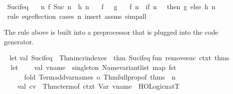 \begin{isabellebody}
\ Suc{\isacharunderscore}if{\isacharunderscore}eq{\isacharcolon}\isanewline
\ \ \ {\isachardoublequoteopen}{\isasymAnd}n{\isachardot}\ f\ {\isacharparenleft}Suc\ n{\isacharparenright}\ {\isasymequiv}\ h\ n{\isachardoublequoteclose}\isanewline
\ \ \ {\isachardoublequoteopen}f\ {}\ {\isasymequiv}\ g{\isachardoublequoteclose}\isanewline
\ \ \ {\isachardoublequoteopen}f\ n\ {\isasymequiv}\ if\ n\ {\isacharequal}\ {}\ then\ g\ else\ h\ {\isacharparenleft}n\ {\isacharminus}\ {}{\isacharparenright}{\isachardoublequoteclose}\isanewline
%
\isadelimproof
\ \ %
\endisadelimproof
%
\isatagproof
{}\isamarkupfalse%
\ {\isacharparenleft}rule\ eq{\isacharunderscore}reflection{\isacharparenright}\ {\isacharparenleft}cases\ n{\isacharcomma}\ insert\ assms{\isacharcomma}\ simp{\isacharunderscore}all{\isacharparenright}%
\endisatagproof
{\isafoldproof}%
%
\isadelimproof
%
\endisadelimproof
%
\begin{isamarkuptext}%
The rule above is built into a preprocessor that is plugged into
  the code generator.%
\end{isamarkuptext}\isamarkuptrue%
%
\isadelimML
%
\endisadelimML
%
\isatagML
{}\isamarkupfalse%
\ {\isacartoucheopen}\isanewline
let\isanewline
\isanewline
val\ Suc{\isacharunderscore}if{\isacharunderscore}eq\ {\isacharequal}\ Thm{\isachardot}incr{\isacharunderscore}indexes\ {}\ {\isacharat}{\isacharbraceleft}thm\ Suc{\isacharunderscore}if{\isacharunderscore}eq{\isacharbraceright}{\isacharsemicolon}\isanewline
\isanewline
fun\ remove{\isacharunderscore}suc\ ctxt\ thms\ {\isacharequal}\isanewline
\ \ let\isanewline
\ \ \ \ val\ vname\ {\isacharequal}\ singleton\ {\isacharparenleft}Name{\isachardot}variant{\isacharunderscore}list\ {\isacharparenleft}map\ fst\isanewline
\ \ \ \ \ \ {\isacharparenleft}fold\ {\isacharparenleft}Term{\isachardot}add{\isacharunderscore}var{\isacharunderscore}names\ o\ Thm{\isachardot}full{\isacharunderscore}prop{\isacharunderscore}of{\isacharparenright}\ thms\ {\isacharbrackleft}{\isacharbrackright}{\isacharparenright}{\isacharparenright}{\isacharparenright}\ {\isachardoublequote}n{\isachardoublequote}{\isacharsemicolon}\isanewline
\ \ \ \ val\ cv\ {\isacharequal}\ Thm{\isachardot}cterm{\isacharunderscore}of\ ctxt\ {\isacharparenleft}Var\ {\isacharparenleft}{\isacharparenleft}vname{\isacharcomma}\ {}{\isacharparenright}{\isacharcomma}\ HOLogic{\isachardot}natT{\isacharparenright}{\isacharparenright}{\isacharsemicolon}\isanewline

\end{isabellebody}
